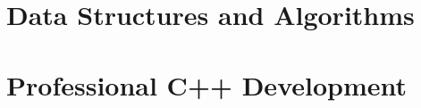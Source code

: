 

































\part{Data Structures and Algorithms}



































\part{Professional C++ Development}

